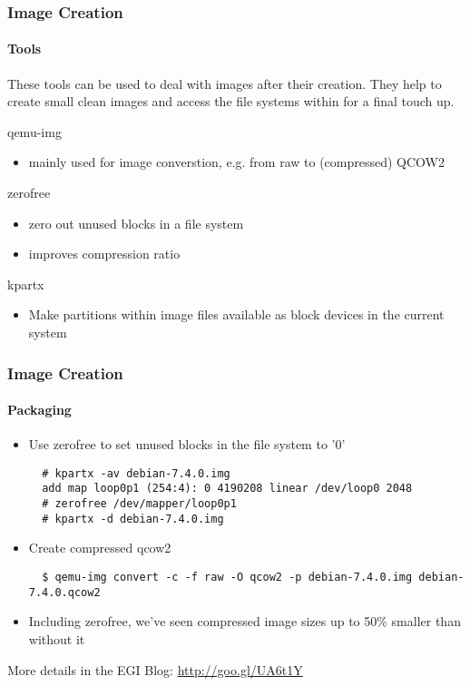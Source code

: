 \begin{frame}
\frametitle{Image Creation}
\framesubtitle{Tools}
These tools can be used to deal with images after their creation. They
help to create small clean images and access the file systems within
for a final touch up.

qemu-img
\begin{itemize}
\item mainly used for image converstion, e.g. from raw to (compressed) QCOW2
\end{itemize}
zerofree
\begin{itemize}
\item zero out unused blocks in a file system
\item improves compression ratio
\end{itemize}
kpartx
\begin{itemize}
\item Make partitions within image files available as block devices in the current system
\end{itemize}
\end{frame}

\begin{frame}[fragile]
\frametitle{Image Creation}
\framesubtitle{Packaging}
\begin{itemize}
\item Use zerofree to set unused blocks in the file system to '0'
  \begin{lstlisting}
  # kpartx -av debian-7.4.0.img
  add map loop0p1 (254:4): 0 4190208 linear /dev/loop0 2048
  # zerofree /dev/mapper/loop0p1
  # kpartx -d debian-7.4.0.img
  \end{lstlisting}
\item Create compressed qcow2
  \begin{lstlisting}
  $ qemu-img convert -c -f raw -O qcow2 -p debian-7.4.0.img debian-7.4.0.qcow2
  \end{lstlisting}
\item Including zerofree, we've seen compressed image sizes up to 50\% smaller
  than without it
\end{itemize}
\hfill\scriptsize More details in the EGI Blog:
  \url{http://goo.gl/UA6t1Y}
\end{frame}

